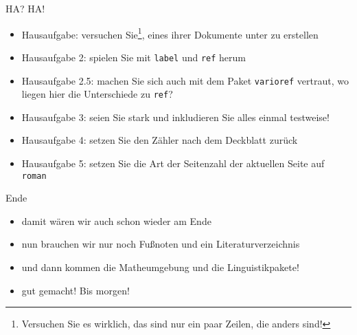 
\begin{frame}[fragile]{HA? HA!}
    \begin{itemize}[<+->]
    \item Hausaufgabe: versuchen Sie\footnote{Versuchen Sie es wirklich, das sind nur ein paar Zeilen, die anders sind!}, eines ihrer Dokumente unter \XeTeX zu erstellen
    \item Hausaufgabe 2: spielen Sie mit \lstinline|label| und \lstinline|ref| herum
    \item Hausaufgabe 2.5: machen Sie sich auch mit dem Paket \lstinline|varioref| vertraut, wo liegen hier die Unterschiede zu \lstinline|ref|?
    \item Hausaufgabe 3: seien Sie stark und inkludieren Sie alles einmal testweise!
    \item Hausaufgabe 4: setzen Sie den Zähler nach dem Deckblatt zurück
    \item Hausaufgabe 5: setzen Sie die Art der Seitenzahl der aktuellen Seite auf \texttt{roman}
    \end{itemize}
\end{frame}

\begin{frame}[fragile]{Ende}
    \begin{itemize}[<+->]
    \item damit wären wir auch schon wieder am Ende
    \item nun brauchen wir nur noch Fußnoten und ein Literaturverzeichnis
    \item und dann kommen die Matheumgebung und die Linguistikpakete!
    \item gut gemacht! Bis morgen!
    \end{itemize}
\end{frame}

